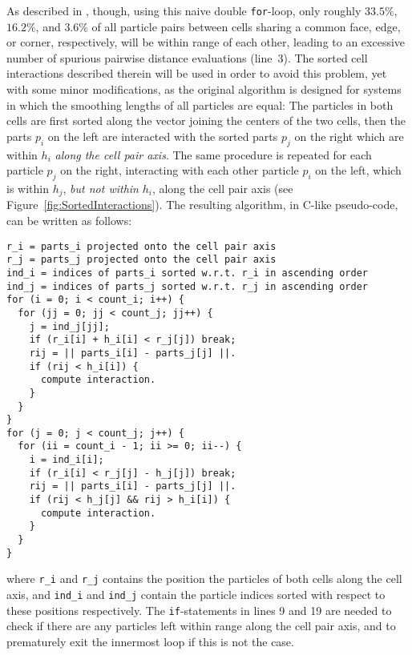 \documentclass[final]{siamltex}
\newcommand{\fig}[1]
    {Figure~\ref{fig:#1}}
\begin{document}
As described in \cite{ref:Gonnet2007}, though, using this
naive double {\tt for}-loop, only roughly $33.5\%$, $16.2\%$,
and $3.6\%$ of all particle
pairs between cells sharing a common face, edge, or corner, respectively,
will be within range of each other, leading
to an excessive number of spurious pairwise distance evaluations (line~3).
The sorted cell interactions described therein will be used in order to
avoid this problem, yet with some minor modifications, as
the original algorithm is designed for systems in which the
smoothing lengths of all particles are equal:
The particles in both cells are first sorted along the vector joining
the centers of the two cells, then the
parts $p_i$ on the left are interacted with the sorted parts $p_j$
on the right which are within $h_i$ {\em along the cell pair axis}.
The same procedure is repeated for each particle $p_j$ on the
right, interacting with each other particle $p_i$ on the
left, which is within $h_j$, {\em but not within} $h_i$, along
the cell pair axis (see \fig{SortedInteractions}).
The resulting algorithm, in C-like pseudo-code, can be written as follows:
        
\begin{center}\begin{minipage}{0.8\textwidth}
    \begin{lstlisting}
r_i = parts_i projected onto the cell pair axis
r_j = parts_j projected onto the cell pair axis
ind_i = indices of parts_i sorted w.r.t. r_i in ascending order
ind_j = indices of parts_j sorted w.r.t. r_j in ascending order
for (i = 0; i < count_i; i++) {
  for (jj = 0; jj < count_j; jj++) {
    j = ind_j[jj];
    if (r_i[i] + h_i[i] < r_j[j]) break;
    rij = || parts_i[i] - parts_j[j] ||.
    if (rij < h_i[i]) {
      compute interaction.
    }
  }
}
for (j = 0; j < count_j; j++) {
  for (ii = count_i - 1; ii >= 0; ii--) {
    i = ind_i[i];
    if (r_i[i] < r_j[j] - h_j[j]) break;
    rij = || parts_i[i] - parts_j[j] ||.
    if (rij < h_j[j] && rij > h_i[i]) {
      compute interaction.
    }
  }
}
    \end{lstlisting}
\end{minipage}\end{center}
        
\noindent where {\tt r\_i} and {\tt r\_j} contains the position
the particles of both cells along the cell axis, and
{\tt ind\_i} and {\tt ind\_j} contain the particle indices
sorted with respect to these positions respectively.
The {\tt if}-statements in lines 9 and 19 are needed to check
if there are any particles left within range along the cell
pair axis, and to prematurely exit the innermost loop if
this is not the case.
\end{document}
